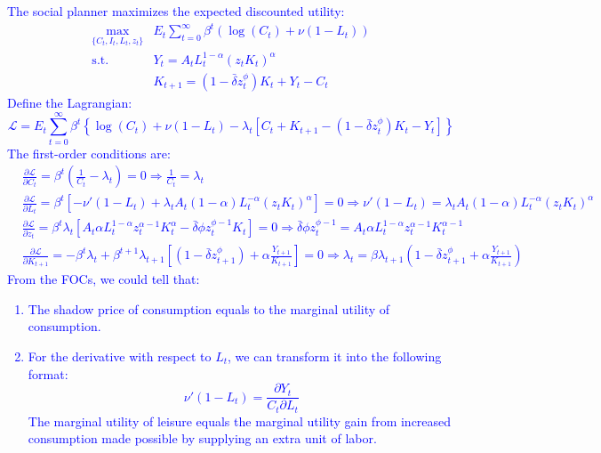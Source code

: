 \begin{solution}
    \textcolor{blue}{
        The social planner maximizes the expected discounted utility:
        \begin{align*}
            \max_{\{C_t, I_t, L_t, z_t\}} & E_t \sum_{t=0}^\infty \beta^t \left(\log(C_t) + \nu(1-L_t)\right) \\
            \text{s.t.} \quad & Y_t = A_t L_t^{1-\alpha} (z_t K_t)^\alpha \\
            \quad \quad & K_{t+1} = (1-\bar{\delta} z_t^\phi) K_t + Y_t - C_t
        \end{align*}
        Define the Lagrangian:
        \[ 
        \mathcal{L} = E_t \sum_{t=0}^\infty \beta^t \left\{\log(C_t) + \nu(1-L_t) - \lambda_t \left[C_t + K_{t+1} - (1-\bar{\delta} z_t^\phi) K_t - Y_t\right]\right\}
        \]
        The first-order conditions are:
        \begin{align}  
            & \frac{\partial \mathcal{L}}{\partial C_t} = \beta^t (\frac{1}{C_t}-\lambda_t) = 0 \Rightarrow \frac{1}{C_t} = \lambda_t \\
            & \frac{\partial \mathcal{L}}{\partial L_t} = \beta^t\left[-\nu'(1-L_t) + \lambda_t A_t (1-\alpha) L_t^{-\alpha} (z_t K_t)^\alpha \right] = 0 \Rightarrow \nu'(1-L_t) = \lambda_t A_t (1-\alpha) L_t^{-\alpha} (z_t K_t)^\alpha \\
            & \frac{\partial \mathcal{L}}{\partial z_t} = \beta^t \lambda_t \left[ A_t \alpha L_t^{1-\alpha} z_t^{\alpha-1} K_t^\alpha - \bar{\delta} \phi z_t^{\phi-1} K_t\right] = 0 \Rightarrow \bar{\delta} \phi z_t^{\phi-1} = A_t \alpha L_t^{1-\alpha} z_t^{\alpha-1} K_t^{\alpha-1}\label{(*)} \\
            & \frac{\partial \mathcal{L}}{\partial K_{t+1}} = -\beta^t \lambda_t + \beta^{t+1}\lambda_{t+1}\left[(1-\bar{\delta}z_{t+1}^{\phi}) + \alpha \frac{Y_{t+1}}{K_{t+1}}\right] = 0 \Rightarrow \lambda_t = \beta \lambda_{t+1} (1-\bar{\delta} z_{t+1}^\phi + \alpha \frac{Y_{t+1}}{K_{t+1}})\label{(**)}
        \end{align}
        From the FOCs, we could tell that:
        \begin{enumerate}
            \item The shadow price of consumption equals to the marginal utility of consumption.
            \item For the derivative with respect to $L_t$, we can transform it into the following format: \[
            \nu'(1-L_t) = \frac{\partial Y_t}{C_t \partial L_t}
            \]
            The marginal utility of leisure equals the marginal utility gain from increased consumption made possible by supplying an extra unit of labor.

\end{enumerate}}
\end{solution}
